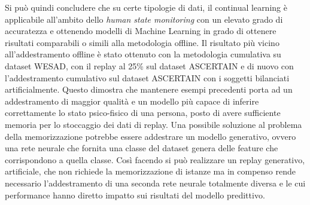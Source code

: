 Si può quindi concludere che su certe tipologie di dati, il continual learning è applicabile all'ambito dello \textit{human state monitoring} con un elevato grado di accuratezza e ottenendo modelli di Machine Learning in grado di ottenere risultati comparabili o simili alla metodologia offline. Il risultato più vicino all'addestramento offline è stato ottenuto con la metodologia cumulativa su dataset WESAD, con il replay al 25\% sul dataset ASCERTAIN e di nuovo con l'addestramento cumulativo sul dataset ASCERTAIN con i soggetti bilanciati artificialmente. Questo dimostra che mantenere esempi precedenti porta ad un addestramento di maggior qualità e un modello più capace di inferire correttamente lo stato psico-fisico di una persona, posto di avere sufficiente memoria per lo stoccaggio dei dati di replay. Una possibile soluzione al problema della memorizzazione potrebbe essere addestrare un modello generativo, ovvero una rete neurale che fornita una classe del dataset genera delle feature che corrispondono a quella classe. Così facendo si può realizzare un replay generativo, artificiale, che non richiede la memorizzazione di istanze ma in compenso rende necessario l'addestramento di una seconda rete neurale totalmente diversa e le cui performance hanno diretto impatto sui risultati del modello predittivo.